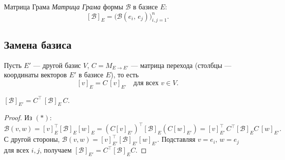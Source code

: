 \begin{Definition}{Матрица Грама}{}
	\textit{Матрица Грама} формы $\mathcal{B}$ в базисе $E$:
	\[
	[\mathcal{B}]_E = \bigl(\mathcal{B}(e_i,\, e_j)\bigr)_{i,j=1}^{n}.
	\] 
\end{Definition}

\subsection*{Замена базиса}

Пусть $E'$ — другой базис $V$, $C = M_{E \to E'}$ — матрица перехода (столбцы — координаты векторов $E'$ в базисе $E$), то есть
\[
[v]_E = C\,[v]_{E'} \quad \text{для всех } v \in V. \tag{$*$}
\] 

\begin{Statement}{}{}
	$[\mathcal{B}]_{E'} = C^{\top}\,[\mathcal{B}]_E\,C$.
\end{Statement}

\begin{proof}
	Из $(*)$:
	\[
	\mathcal{B}(v,w) = [v]_E^{\top}[\mathcal{B}]_E[w]_E
	= (C[v]_{E'})^{\top}[\mathcal{B}]_E(C[w]_{E'})
	= [v]_{E'}^{\top}\, C^{\top}[\mathcal{B}]_E C\,[w]_{E'}.
	\] 
	С другой стороны, $\mathcal{B}(v,w) = [v]_{E'}^{\top}[\mathcal{B}]_{E'}[w]_{E'}$.
	Подставляя $v = e_i,\, w = e_j$ для всех $i,j$, получаем $[\mathcal{B}]_{E'} = C^{\top}[\mathcal{B}]_E C$.
\end{proof}

